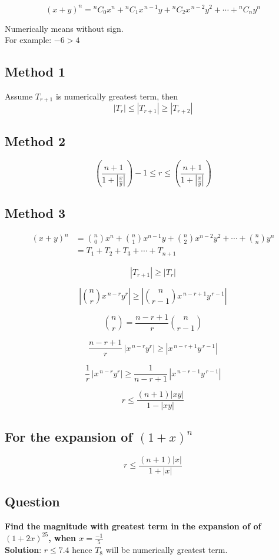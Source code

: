 \documentclass[12pt]{article}
\begin{document}
\[
(x+y)^n = {}^{n}C_{0}x^n 
+ {}^{n}C_{1}x^{\,n-1}y 
+ {}^{n}C_{2}x^{\,n-2}y^2 
+ \cdots 
+ {}^{n}C_{n}y^n
\]

Numerically means without sign. \\
For example: $ -6 > 4$
\subsection*{Method 1}
Assume $T_{r+1}$ is numerically greatest term, then 
\[
\left | T_{r} \right | \leq \left | T_{r+1} \right | \geq \left | T_{r+2}  \right |
\]

\subsection*{Method 2}
\[
\left( \frac{n+1}{1+\left|\frac{x}{y}\right|} \right) - 1
\le r \le
\left( \frac{n+1}{1+\left|\frac{x}{y}\right|} \right)
\]

\subsection*{Method 3}
\[
\begin{aligned}
(x+y)^n 
&= \binom{n}{0}x^n 
+ \binom{n}{1}x^{n-1}y 
+ \binom{n}{2}x^{n-2}y^2 
+ \cdots 
+ \binom{n}{n}y^n \\[6pt]
&= T_1 + T_2 + T_3 + \cdots + T_{n+1}
\end{aligned}
\]

\[
|T_{r+1}| \ge |T_r|
\]

\[
\left| \binom{n}{r} x^{\,n-r} y^r \right|
\ge
\left| \binom{n}{r-1} x^{\,n-r+1} y^{\,r-1} \right|
\]

\[
\binom{n}{r} = \frac{n-r+1}{r}\binom{n}{r-1}
\]

\[
\frac{n-r+1}{r}\, |x^{\,n-r} y^r|
\ge
|x^{\,n-r+1} y^{\,r-1}|
\]

\[
\frac{1}{r}\, |x^{\,n-r} y^r|
\ge
\frac{1}{n-r+1}\, |x^{\,n-r-1} y^{\,r-1}|
\]

\[
\boxed{
r \le \frac{(n+1)|xy|}{1 - |xy|}
}
\]

\subsection{For the expansion of $(1+x)^n$}
\[
\boxed{r \leq \frac{(n+1)|x|}{1+|x|}}
\]

\subsection*{Question}
\textbf{Find the magnitude with greatest term in the expansion of of $(1+2x)^{25}$, when $x = \frac{-1}{5}$ }\\
\textbf{Solution}: $r \leq 7.4$ hence $T_8$ will be numerically greatest term.
\end{document}
